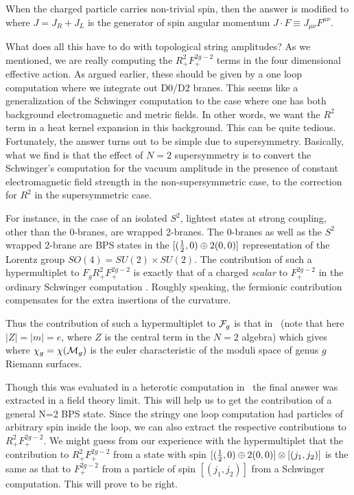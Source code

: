 When the charged particle carries non-trivial spin, then the answer is
modified to
%
\eqn{}
%
where $J=J_R+J_L$ is the generator of spin angular momentum $J\cdot F
\equiv J_{\mu \nu}F^{\mu \nu}$.

What does all this have to do
with topological string amplitudes? As we mentioned,
we are really computing the $R_+^2 F_+^{2g-2}$ terms in the four
dimensional effective action. As argued earlier, these should be given by a
one loop computation where we integrate out D0/D2 branes. This seems like a
generalization of the Schwinger computation to the case where one has both
background electromagnetic and metric fields. In other words, we want the
$R^2$ term in a heat kernel expansion in this background. This can be
quite tedious. Fortunately, the answer turns out to be simple due to
supersymmetry.  Basically, what we find is that the
effect of $N=2$ supersymmetry is to convert the Schwinger's
computation for the vacuum amplitude in the presence of constant
electromagnetic field strength in the non-supersymmetric case, to the
correction for $R^2$ in the supersymmetric case.

For instance, in the case of an isolated $S^2$,
lightest states at strong coupling,
other than the 0-branes, are wrapped 2-branes.
The 0-branes as well as the $S^2$
wrapped 2-brane are BPS states
in the $[({1\over 2},0)\oplus 2(0,0)]$ representation of the
Lorentz group $SO(4)=SU(2)\times SU(2)$.
The contribution of such a hypermultiplet to $F_gR_+^2 F_+^{2g-2}$
is exactly that of a charged {\it scalar} to $F_+^{2g-2}$ in the
ordinary Schwinger computation \narcon . Roughly speaking, the fermionic
contribution compensates for the extra insertions of the curvature.

Thus the contribution of such a hypermultiplet to ${\cal F}_g$ is that in
\sch\ (note that here $|Z|=|m|=e$, where $Z$ is the central term
in the $ N=2$ algebra)
%
\eqn{}
%
which gives
%
\eqn{}
%
where $\chi_g=\chi({\cal M}_g)$ is the euler characteristic of the moduli
space of genus $g$ Riemann surfaces.

Though this was evaluated in a heterotic computation in \narcon\
the final answer was extracted in a field theory
limit. This will help us to get the contribution of a general N=2 BPS state.
Since the stringy one loop computation had particles of arbitrary spin
inside the loop, we can also extract the respective contributions
to $R_+^2F_+^{2g-2}$.
We might guess from our experience with the
hypermultiplet that the contribution
to $R_+^2F_+^{2g-2}$ from a state with spin
$[({1\over 2},0)\oplus 2(0,0)]\otimes [(j_1,j_2)]$
is the same as that to $F_+^{2g-2}$ from a particle of spin
$[(j_1,j_2)]$ from a Schwinger computation. This will prove to be right.

